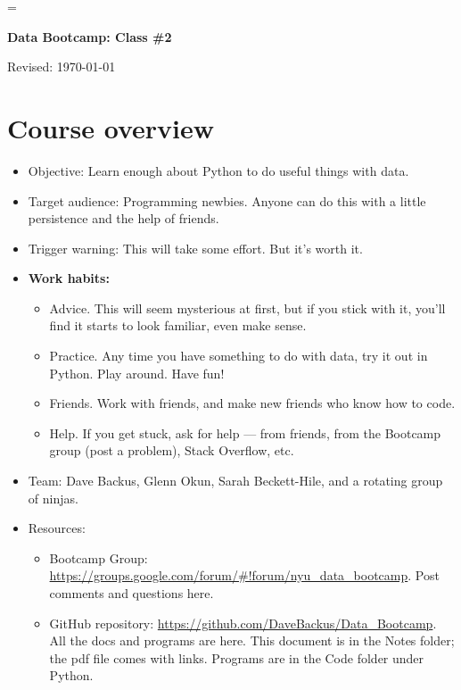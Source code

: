\documentclass[11pt]{article}
\begin{document}
\parskip=\bigskipamount
\parindent=0.0in
\thispagestyle{empty}


\bigskip\bigskip
\centerline{\Large \bf Data Bootcamp:  Class \#2}
\centerline{Revised: \today}


\begin{comment}
* Today:  graphics
* Something to do:  look for cool graphics, think about how you'd do it, also data
* Warning:  need to work.  Introduce yourself to your neighbor.  Raise your hand if you have trouble.
* Before we start
    - start Spyder
    - download bootcamp_graphics.py
\end{comment}


\section{Course overview}

\begin{itemize}
\item Objective:  Learn enough about Python to do useful things with data.
\item Target audience:  Programming newbies.
Anyone can do this with a little persistence and the help of friends.
\item Trigger warning:  This will take some effort.  But it's worth it.

\item {\bf Work habits:}
\begin{itemize}
\item Advice.  This will seem mysterious at first, but if you stick with it,
you'll find it starts to look familiar, even make sense.
\item Practice.  Any time you have something to do with data, try it out in Python.
Play around.  Have fun!
\item Friends.  Work with friends, and make new friends who know how to code.
\item Help.  If you get stuck, ask for help --- from friends,
from the Bootcamp group (post a problem), Stack Overflow, etc.
\end{itemize}
\item Team:  Dave Backus, Glenn Okun, Sarah Beckett-Hile, and a rotating group of ninjas.

\item Resources:
\begin{itemize}
\item Bootcamp Group:  \url{https://groups.google.com/forum/#!forum/nyu_data_bootcamp}.
Post comments and questions here.

\item GitHub repository:  \url{https://github.com/DaveBackus/Data_Bootcamp}.
All the docs and programs are here.
This document is in the Notes folder;
the pdf file comes with links.
Programs are in the Code folder under Python.
\end{itemize}

\end{itemize}
\end{document}
